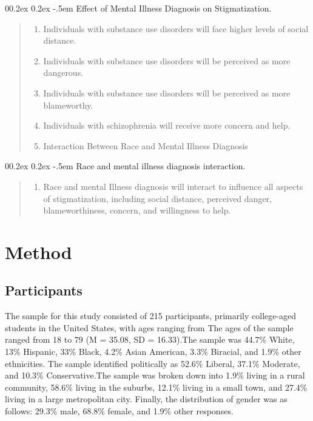\documentclass[
  man,
  floatsintext,
  longtable,
  nolmodern,
  notxfonts,
  notimes,
  colorlinks=true,linkcolor=blue,citecolor=blue,urlcolor=blue]{apa7}
\makeatletter
\renewcommand{\paragraph}{\@startsection{paragraph}{4}{\parindent}%
	{0\baselineskip \@plus 0.2ex \@minus 0.2ex}%
	{-.5em}%
	{\normalfont\normalsize\bfseries\typesectitle}}
\providecommand{\tightlist}{%
  \setlength{\itemsep}{0pt}\setlength{\parskip}{0pt}}
\makeatother
\begin{document}
\paragraph{Effect of Mental Illness Diagnosis on
Stigmatization.}\label{effect-of-mental-illness-diagnosis-on-stigmatization}

\begin{quote}
\begin{enumerate}
\def\labelenumi{\arabic{enumi}.}
\tightlist
\item
  Individuals with substance use disorders will face higher levels of
  social distance.
\item
  Individuals with substance use disorders will be perceived as more
  dangerous.
\item
  Individuals with substance use disorders will be perceived as more
  blameworthy.
\item
  Individuals with schizophrenia will receive more concern and help.
\item
  Interaction Between Race and Mental Illness Diagnosis
\end{enumerate}
\end{quote}

\paragraph{Race and mental illness diagnosis
interaction.}\label{race-and-mental-illness-diagnosis-interaction}

\begin{quote}
\begin{enumerate}
\def\labelenumi{\arabic{enumi}.}
\tightlist
\item
  Race and mental Illness diagnosis will interact to influence all
  aspects of stigmatization, including social distance, perceived
  danger, blameworthiness, concern, and willingness to help.
\end{enumerate}
\end{quote}

\section{Method}\label{method}

\subsection{Participants}\label{participants}

The sample for this study consisted of 215 participants, primarily
college-aged students in the United States, with ages ranging from The
ages of the sample ranged from 18 to 79 (M = 35.08, SD = 16.33).The
sample was 44.7\% White, 13\% Hispanic, 33\% Black, 4.2\% Asian
American, 3.3\% Biracial, and 1.9\% other ethnicities. The sample
identified politically as 52.6\% Liberal, 37.1\% Moderate, and 10.3\%
Conservative.The sample was broken down into 1.9\% living in a rural
community, 58.6\% living in the suburbs, 12.1\% living in a small town,
and 27.4\% living in a large metropolitan city. Finally, the
distribution of gender was as follows: 29.3\% male, 68.8\% female, and
1.9\% other responses.
\end{document}
